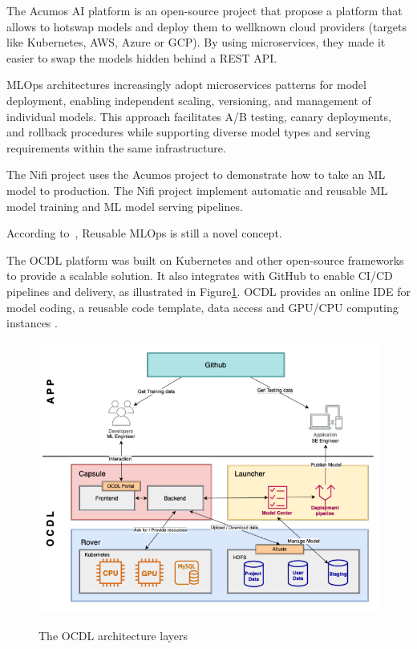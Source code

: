 The Acumos AI platform\cite{10690392} is an open-source project that propose a platform that allows to hotswap models and deploy
them to wellknown cloud providers (targets like Kubernetes, AWS, Azure or GCP).
By using microservices, they made it easier to swap the models hidden behind a REST API\@.

MLOps architectures increasingly adopt microservices patterns for model deployment, enabling independent scaling, versioning, and management of individual models.
This approach facilitates A/B testing, canary deployments, and rollback procedures while supporting diverse model types and serving requirements within the same infrastructure\cite{gift2021practical, 10.1145/3533378}.

The Nifi project\cite{10346079} uses the Acumos project to demonstrate how to take an ML model
to production.
The Nifi project implement automatic and reusable ML model training and ML model serving pipelines.

According to~\cite{10690392}, Reusable MLOps is still a novel concept.

The OCDL platform\cite{LIU2020704} was built on Kubernetes and other open-source frameworks to provide a scalable solution.
It also integrates with GitHub to enable CI/CD pipelines and delivery, as illustrated in Figure\ref{fig:ocdl}.
OCDL provides an online IDE for model coding, a reusable code template, data access and GPU/CPU computing instances\cite{LIU2020704} .

\begin{figure}[!htbp]
    \caption{The OCDL architecture layers\cite{LIU2020704}}
    \centering
    \includegraphics[scale=0.5]{images/ocdl-architecture}
    \label{fig:ocdl}
\end{figure}

